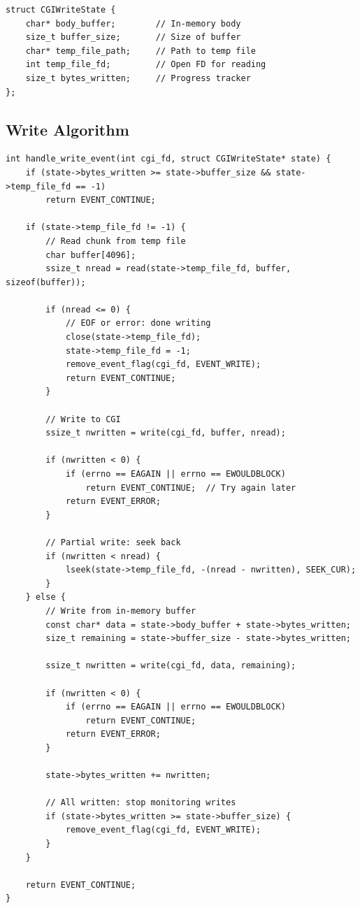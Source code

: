 \documentclass[12pt,a4paper]{article}
\begin{document}
\begin{lstlisting}[caption=Request Body State]
struct CGIWriteState {
    char* body_buffer;        // In-memory body
    size_t buffer_size;       // Size of buffer
    char* temp_file_path;     // Path to temp file
    int temp_file_fd;         // Open FD for reading
    size_t bytes_written;     // Progress tracker
};
\end{lstlisting}

\subsection{Write Algorithm}

\begin{lstlisting}[caption=Asynchronous Body Writing]
int handle_write_event(int cgi_fd, struct CGIWriteState* state) {
    if (state->bytes_written >= state->buffer_size && state->temp_file_fd == -1)
        return EVENT_CONTINUE;
    
    if (state->temp_file_fd != -1) {
        // Read chunk from temp file
        char buffer[4096];
        ssize_t nread = read(state->temp_file_fd, buffer, sizeof(buffer));
        
        if (nread <= 0) {
            // EOF or error: done writing
            close(state->temp_file_fd);
            state->temp_file_fd = -1;
            remove_event_flag(cgi_fd, EVENT_WRITE);
            return EVENT_CONTINUE;
        }
        
        // Write to CGI
        ssize_t nwritten = write(cgi_fd, buffer, nread);
        
        if (nwritten < 0) {
            if (errno == EAGAIN || errno == EWOULDBLOCK)
                return EVENT_CONTINUE;  // Try again later
            return EVENT_ERROR;
        }
        
        // Partial write: seek back
        if (nwritten < nread) {
            lseek(state->temp_file_fd, -(nread - nwritten), SEEK_CUR);
        }
    } else {
        // Write from in-memory buffer
        const char* data = state->body_buffer + state->bytes_written;
        size_t remaining = state->buffer_size - state->bytes_written;
        
        ssize_t nwritten = write(cgi_fd, data, remaining);
        
        if (nwritten < 0) {
            if (errno == EAGAIN || errno == EWOULDBLOCK)
                return EVENT_CONTINUE;
            return EVENT_ERROR;
        }
        
        state->bytes_written += nwritten;
        
        // All written: stop monitoring writes
        if (state->bytes_written >= state->buffer_size) {
            remove_event_flag(cgi_fd, EVENT_WRITE);
        }
    }
    
    return EVENT_CONTINUE;
}
\end{lstlisting}
\end{document}
